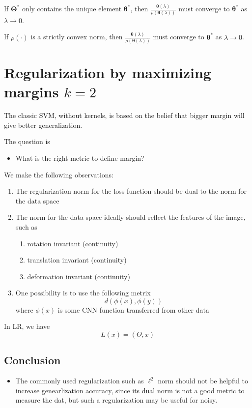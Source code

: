 \begin{corollary}
	If $\bm\Theta^*$ only contains the unique element $\bm\theta^*$, then $\frac{\bm\theta(\lambda)}{\rho(\bm\theta(\lambda))}$ must converge to $\bm\theta^*$ as $\lambda\rightarrow 0$.
\end{corollary}

\begin{corollary}
	If $\rho(\cdot)$ is a strictly convex norm, then $\frac{\bm\theta(\lambda)}{\rho(\bm\theta(\lambda))}$ must converge to $\bm\theta^*$ as $\lambda\rightarrow 0$.
\end{corollary}

\newpage
\section{Regularization by maximizing margins $k=2$}
The classic SVM, without kernels, is based on the belief that
bigger margin will give better generalization.

The question is 
\begin{itemize}
\item What is the right metric to define margin?
\end{itemize}

We make the following observations:
\begin{enumerate}
\item  The regularization norm for the loss function should be dual to the
norm  for the data space
\item The norm for the data space ideally should reflect the features
  of the image, such as 

\begin{enumerate}
\item rotation invariant (continuity)
\item translation invariant (continuity)
\item deformation invariant (continuity)
\end{enumerate}

\item One possibility is to use the following metrix
$$
d(\phi(x), \phi(y) )
$$
where $\phi(x)$ is some CNN function transferred from other data 
\end{enumerate}

In LR, we have
$$
L(x)=(\Theta, x)
$$

\subsection{Conclusion}
\begin{itemize}
\item The commonly used regularization such as $\ell^2$ norm should
  not be helpful to increase genearlization accuracy, since its dual norm is not
  a good metric to measure the dat, but such a regularization may be
  useful for noisy.
\end{itemize}


